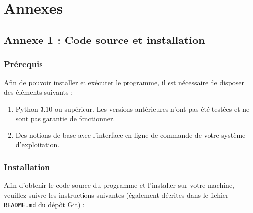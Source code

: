 \documentclass[12pt]{scrreprt} %
\begin{document}
\chapter*{Annexes}

\section*{Annexe 1 : Code source et installation}

\subsection*{Prérequis}

Afin de pouvoir installer et exécuter le programme, il est nécessaire de disposer des éléments suivants :
\begin{enumerate}
    \item Python 3.10 ou supérieur. Les versions antérieures n'ont pas été testées et ne sont pas garantie de fonctionner.
    \item Des notions de base avec l'interface en ligne de commande de votre système d'exploitation.
\end{enumerate}

\subsection*{Installation}

Afin d'obtenir le code source du programme et l'installer sur votre machine, veuillez suivre les instructions suivantes (également décrites dans le fichier \texttt{README.md} du dépôt Git) :
\end{document}
